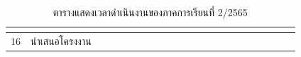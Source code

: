 \documentclass[12pt,oneside,openright,a4paper]{cpe-thai-project}
\begin{document}
\begin{table}[!ht]
{\begin{tabular}{|llllllllllllllllllllll|}
      \multicolumn{1}{l|}{} &
      \multicolumn{1}{l|}{} &
      \multicolumn{1}{l|}{} &
      \multicolumn{1}{l|}{} &
      \multicolumn{1}{l|}{} &
      \multicolumn{1}{l|}{} &
      \multicolumn{1}{l|}{} &
      \multicolumn{1}{l|}{} &
      \multicolumn{1}{l|}{\cellcolor[HTML]{FFCE93}} &
      \multicolumn{1}{l|}{\cellcolor[HTML]{FFCE93}} &
      \multicolumn{1}{l|}{\cellcolor[HTML]{FFCE93}} &
      \multicolumn{1}{l|}{\cellcolor[HTML]{FFCE93}} &
      \multicolumn{1}{l|}{\cellcolor[HTML]{FFCE93}} &
      \multicolumn{1}{l|}{\cellcolor[HTML]{FFCE93}} &
      \multicolumn{1}{l|}{\cellcolor[HTML]{FFCE93}} &
      \multicolumn{1}{l|}{\cellcolor[HTML]{FFCE93}} &
      \multicolumn{1}{l|}{} &
      \multicolumn{1}{l|}{} &
      \multicolumn{1}{l|}{} &
       \\ \hline
    \multicolumn{1}{|l|}{16} &
      \multicolumn{1}{l|}{นำเสนอโครงงาน} &
      \multicolumn{1}{l|}{} &
      \multicolumn{1}{l|}{} &
      \multicolumn{1}{l|}{} &
      \multicolumn{1}{l|}{} &
      \multicolumn{1}{l|}{} &
      \multicolumn{1}{l|}{} &
      \multicolumn{1}{l|}{} &
      \multicolumn{1}{l|}{} &
      \multicolumn{1}{l|}{} &
      \multicolumn{1}{l|}{} &
      \multicolumn{1}{l|}{} &
      \multicolumn{1}{l|}{} &
      \multicolumn{1}{l|}{} &
      \multicolumn{1}{l|}{} &
      \multicolumn{1}{l|}{} &
      \multicolumn{1}{l|}{\cellcolor[HTML]{FFCE93}} &
      \multicolumn{1}{l|}{} &
      \multicolumn{1}{l|}{} &
      \multicolumn{1}{l|}{} &
       \\ \hline
    \end{tabular} %
    }
    \caption{\centering  ตารางแสดงเวลาดำเนินงานของภาคการเรียนที่ 2/2565} \label{tbl:working2}
\end{table}

\end{document}
